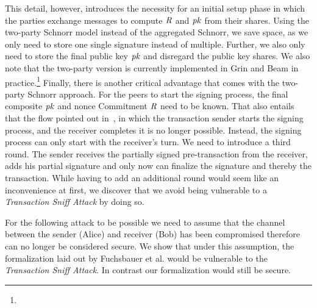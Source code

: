 This detail, however, introduces the necessity for an initial setup phase in which the parties exchange messages to compute $\mathit{R}$ and $\mathit{pk}$ from their shares.
Using the two-party Schnorr model instead of the aggregated Schnorr, we save space, as we only need to store one single signature instead of multiple.
Further, we also only need to store the final public key $\mathit{pk}$ and disregard the public key shares.
We also note that the two-party version is currently implemented in Grin and Beam in practice.\footnote{\urlgrinexplained}
Finally, there is another critical advantage that comes with the two-party Schnorr approach.
For the peers to start the signing process, the final composite $\mathit{pk}$ and nonce Commitment $\mathit{R}$ need to be known.
That also entails that the flow pointed out in~\cite{fuchsbauer2019aggregate}, in which the transaction sender starts the signing process, and the receiver completes it is no longer possible.
Instead, the signing process can only start with the receiver's turn.
We need to introduce a third round.
The sender receives the partially signed pre-transaction from the receiver, adds his partial signature and only now can finalize the signature and thereby the transaction.
While having to add an additional round would seem like an inconvenience at first, we discover that we avoid being vulnerable to a \emph{Transaction Sniff Attack} by doing so.

For the following attack to be possible we need to assume that the channel between the sender (Alice) and receiver (Bob) has been compromised therefore can no longer be considered secure.
We show that under this assumption, the formalization laid out by Fuchsbauer et al. would be vulnerable to the \emph{Transaction Sniff Attack}.
In contrast our formalization would still be secure.
